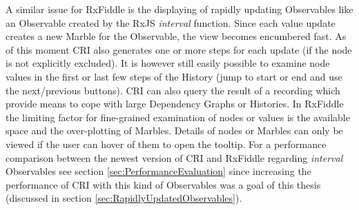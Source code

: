 	A similar issue for RxFiddle is the displaying of rapidly updating Observables like an Observable created by the RxJS \emph{interval} function. Since each value update creates a new Marble for the Observable, the view becomes encumbered fast. As of this moment CRI also generates one or more steps for each update (if the node is not explicitly excluded). It is however still easily possible to examine node values in the first or last few steps of the History (jump to start or end and use the next/previous buttons). CRI can also query the result of a recording which provide means to cope with large Dependency Graphs or Histories. In RxFiddle the limiting factor for  fine-grained examination of nodes or values is the available space and the over-plotting of Marbles. Details of nodes or Marbles can only be viewed if the user can hover of them to open the tooltip. For a performance comparison between the newest version of CRI and RxFiddle regarding \emph{interval} Observables see section \ref{sec:PerformanceEvaluation} since increasing the performance of CRI with this kind of Observables was a goal of this thesis (discussed in section \ref{sec:RapidlyUpdatedObservables}).